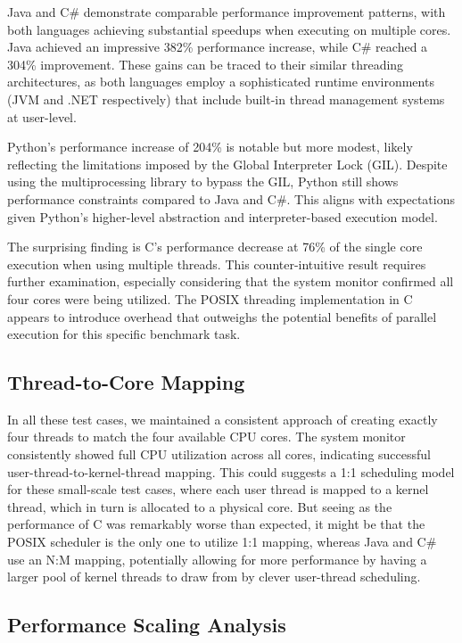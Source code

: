 \documentclass[12pt,a4paper]{article}
\begin{document}
Java and C\# demonstrate comparable performance improvement patterns, with both languages achieving substantial speedups when executing on multiple cores. Java achieved an impressive 382\% performance increase, while C\# reached a 304\% improvement. These gains can be traced to their similar threading architectures, as both languages employ a sophisticated runtime environments (JVM and .NET respectively) that include built-in thread management systems at user-level.

Python's performance increase of 204\% is notable but more modest, likely reflecting the limitations imposed by the Global Interpreter Lock (GIL). Despite using the multiprocessing library to bypass the GIL, Python still shows performance constraints compared to Java and C\#. This aligns with expectations given Python's higher-level abstraction and interpreter-based execution model.

The surprising finding is C's performance decrease at 76\% of the single core execution when using multiple threads. This counter-intuitive result requires further examination, especially considering that the system monitor confirmed all four cores were being utilized. The POSIX threading implementation in C appears to introduce overhead that outweighs the potential benefits of parallel execution for this specific benchmark task.

\subsection{Thread-to-Core Mapping}

In all these test cases, we maintained a consistent approach of creating exactly four threads to match the four available CPU cores. The system monitor consistently showed full CPU utilization across all cores, indicating successful user-thread-to-kernel-thread mapping. This could suggests a 1:1 scheduling model for these small-scale test cases, where each user thread is mapped to a kernel thread, which in turn is allocated to a physical core. But seeing as the performance of C was remarkably worse than expected, it might be that the POSIX scheduler is the only one to utilize 1:1 mapping, whereas Java and C\# use an N:M mapping, potentially allowing for more performance by having a larger pool of kernel threads to draw from by clever user-thread scheduling.

\subsection{Performance Scaling Analysis}
\end{document}
